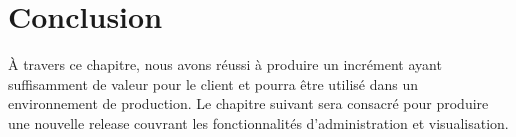 \section*{Conclusion}

À travers ce chapitre, nous avons réussi à produire un incrément ayant suffisamment de valeur pour
le client et pourra être utilisé dans un environnement de production.
Le chapitre suivant sera consacré pour produire une nouvelle release couvrant les
fonctionnalités d'administration et visualisation.
  